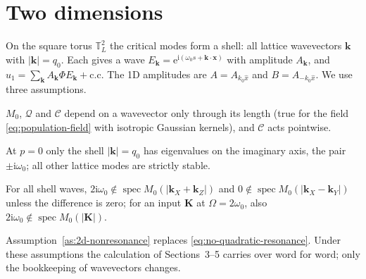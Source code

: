 \documentclass[11pt]{article}
\newcommand{\ii}{\mathrm{i}}
\newcommand{\ee}{\mathrm{e}}
\newcommand{\cQ}{\mathcal{Q}}
\newcommand{\cC}{\mathcal{C}}
\newcommand{\cc}{\mathrm{c.c.}}
\newcommand{\T}{\mathbb{T}}
\begin{document}
\section{Two dimensions}
\label{sec:two-dimensions}
On the square torus $\T_L^2$ the critical modes form a shell: all lattice
wavevectors $\boldsymbol k$ with $|\boldsymbol k|=q_0$. Each gives a wave
$E_{\boldsymbol k}=\ee^{\ii(\omega_0s+\boldsymbol k\cdot\boldsymbol x)}$ with
amplitude $A_{\boldsymbol k}$, and
$u_1=\sum_{\boldsymbol k}A_{\boldsymbol k}\Phi E_{\boldsymbol k}+\cc$
The 1D amplitudes are $A=A_{k_0\hat x}$ and $B=A_{-k_0\hat x}$. We use three
assumptions.
\begin{assumption}\label{as:isotropy}
$M_0$, $\cQ$ and $\cC$ depend on a wavevector only through its length (true
for the field \eqref{eq:population-field} with isotropic Gaussian kernels), and
$\cC$ acts pointwise.
\end{assumption}
\begin{assumption}\label{as:one-shell}
At $p=0$ only the shell $|\boldsymbol k|=q_0$ has eigenvalues on the imaginary
axis, the pair $\pm\ii\omega_0$; all other lattice modes are strictly stable.
\end{assumption}
\begin{assumption}\label{as:2d-nonresonance}
For all shell waves, $2\ii\omega_0\notin\operatorname{spec}M_0(|\boldsymbol k_X+\boldsymbol k_Z|)$
and $0\notin\operatorname{spec}M_0(|\boldsymbol k_X-\boldsymbol k_Y|)$ unless the
difference is zero; for an input $\boldsymbol K$ at $\Omega=2\omega_0$, also
$2\ii\omega_0\notin\operatorname{spec}M_0(|\boldsymbol K|)$.
\end{assumption}
Assumption~\ref{as:2d-nonresonance} replaces \eqref{eq:no-quadratic-resonance}.
Under these assumptions the calculation of Sections~3--5 carries over word for
word; only the bookkeeping of wavevectors changes.
\end{document}
